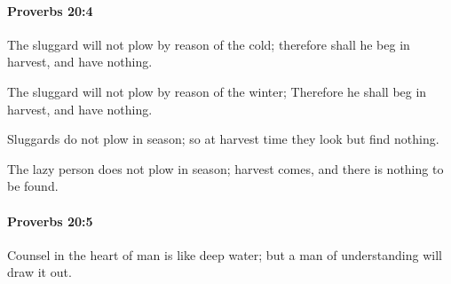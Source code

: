 		\paragraph{Proverbs 20:4} %
			\label{PROVERBS-20-4}

			The sluggard will not plow by reason of the cold; therefore shall he beg in harvest, and have nothing.

			\begin{versebox}
					\item[BHS] 
					\item[ASV] The sluggard will not plow by reason of the winter; Therefore he shall beg in harvest, and have nothing.
					\item[NIV] Sluggards do not plow in season; so at harvest time they look but find nothing.
					\item[NRSV] The lazy person does not plow in season; harvest comes, and there is nothing to be found.
			\end{versebox}

		\paragraph{Proverbs 20:5} %
			\label{PROVERBS-20-5}

			Counsel in the heart of man is like deep water; but a man of understanding will draw it out.

